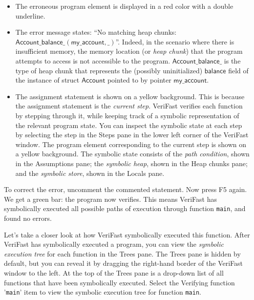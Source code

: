 \documentclass{article}
\begin{document}
\begin{itemize}
\item The erroneous program element is displayed in a red
    color with a double underline.
\item The error message states: ``No matching heap chunks: $\mathsf{Account\_balance\_(my\_account, \_)}$''. Indeed, in the scenario where there
    is insufficient memory, the memory location (or
    \emph{heap chunk}) that the program attempts to access
    is not accessible to the program.
    $\mathsf{Account\_balance\_}$ is the type of heap chunk
    that represents the (possibly uninitialized) $\mathsf{balance}$ field of the
    instance of struct $\mathsf{Account}$ pointed to by pointer $\mathsf{my\_account}$.
\item The assignment statement is shown on a yellow
    background. This is because the assignment statement is
    the \emph{current step}. VeriFast verifies each
    function by stepping through it, while keeping track of
    a symbolic representation of the relevant program
    state. You can inspect the symbolic state at each step
    by selecting the step in the Steps pane in the lower
    left corner of the VeriFast window. The program element
    corresponding to the current step is shown on a yellow
    background. The symbolic state consists of the
    \emph{path condition}, shown in the Assumptions pane;
    the \emph{symbolic heap}, shown in the Heap chunks
    pane; and the \emph{symbolic store}, shown in the
    Locals pane.
\end{itemize}

To correct the error, uncomment the commented statement. Now
press F5 again. We get a green bar: the program now verifies. This means VeriFast has symbolically executed all possible paths of execution through function \lstinline|main|, and found no errors.

Let's take a closer look at how VeriFast symbolically executed this function. After VeriFast has symbolically executed a program, you can view the \emph{symbolic execution tree} for each function in the Trees pane. The Trees pane is hidden by default, but you can reveal it by dragging the right-hand border of the VeriFast window to the left. At the top of the Trees pane is a drop-down list of all functions that have been symbolically executed. Select the \textsf{Verifying function '\lstinline|main|'} item to view the symbolic execution tree for function \lstinline|main|.
\end{document}

